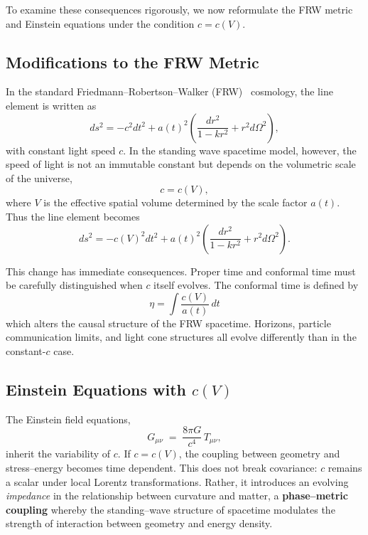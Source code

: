 \documentclass[12pt]{article}
\begin{document}
\medskip
To examine these consequences rigorously, we now reformulate the FRW metric and Einstein equations under the condition $c = c(V)$.

\subsection{Modifications to the FRW Metric}

In the standard Friedmann–Robertson–Walker (FRW)~\cite{frw} cosmology, the line element is written as
\begin{equation}
  ds^2 = -c^2 dt^2 + a(t)^2 \left( \frac{dr^2}{1 - k r^2} + r^2 d\Omega^2 \right),
\end{equation}
with constant light speed \(c\). In the standing wave spacetime model, however, the speed of light is not an immutable constant but depends on the volumetric scale of the universe,
\begin{equation}
  c = c(V),
\end{equation}
where \(V\) is the effective spatial volume determined by the scale factor \(a(t)\). Thus the line element becomes
\begin{equation}
  ds^2 = -c(V)^2 dt^2 + a(t)^2 \left( \frac{dr^2}{1 - k r^2} + r^2 d\Omega^2 \right).
\end{equation}

This change has immediate consequences. Proper time and conformal time must be carefully distinguished when \(c\) itself evolves. The conformal time is defined by
\begin{equation}
\eta = \int \frac{c(V)}{a(t)} \, dt
\label{eq:frw_conformal_time}
\end{equation}
which alters the causal structure of the FRW spacetime. Horizons, particle communication limits, and light cone structures all evolve differently than in the constant-\(c\) case.

\subsection{Einstein Equations with \texorpdfstring{$c(V)$}{c(V)}}

The Einstein field equations,
\begin{equation}
  G_{\mu\nu} \;=\; \frac{8\pi G}{c^4}\,T_{\mu\nu},
\end{equation}
inherit the variability of \(c\).  If \(c = c(V)\), the coupling between geometry and stress–energy becomes time dependent.  This does not break covariance: \(c\) remains a scalar under local Lorentz transformations.  Rather, it introduces an evolving \emph{impedance} in the relationship between curvature and matter, a \textbf{phase–metric coupling} whereby the standing–wave structure of spacetime modulates the strength of interaction between geometry and energy density.
\end{document}
